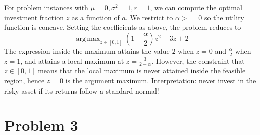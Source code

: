 \documentclass{article}
\DeclareMathOperator*{\argmax}{arg\,max}
\begin{document}
For problem instances with $\mu=0, \sigma^2=1, r=1$, we can compute the optimal investment fraction $z$ as a function of $a$. We restrict to $\alpha >= 0$ so the utility function is concave. Setting the coefficients as above, the problem reduces to
\begin{equation}
    \argmax_{z \in [0,1]} \left(1-\frac{\alpha}{2}\right) z^2 -3z + 2
\end{equation}
The expression inside the maximum attains the value $2$ when $z=0$ and $\frac{\alpha}{2}$ when $z=1$, and attains a local maximum at $z=\frac{3}{2-\alpha}$. However, the constraint that $z \in [0, 1]$ means that the local maximum is never attained inside the feasible region, hence $z=0$ is the argument maximum. Interpretation: never invest in the risky asset if its returns follow a standard normal!

\section*{Problem 3}
\end{document}

